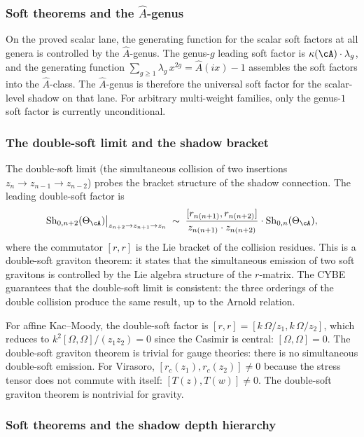 \subsubsection*{Soft theorems and the $\hat A$-genus}

On the proved scalar lane, the generating function for the
scalar soft factors at all genera is controlled by the
$\hat A$-genus. The genus-$g$ leading soft factor is
$\kappa(\cA)\cdot\lambda_g$, and the generating function
$\sum_{g\ge 1}\lambda_g\,x^{2g}=\hat A(ix)-1$
assembles the soft factors into the $\hat A$-class. The
$\hat A$-genus is therefore the universal soft factor for the
scalar-level shadow on that lane. For arbitrary multi-weight
families, only the genus-$1$ soft factor is currently
unconditional.

\subsubsection*{The double-soft limit and the shadow bracket}

The double-soft limit (the simultaneous collision of two
insertions $z_n\to z_{n-1}\to z_{n-2}$) probes the bracket
structure of the shadow connection. The leading double-soft
factor is
\[
\mathrm{Sh}_{0,n+2}(\Theta_\cA)\big|_{z_{n+2}\to z_{n+1}
\to z_n}
\;\sim\;
\frac{[r_{n(n+1)},r_{n(n+2)}]}{z_{n(n+1)}\cdot z_{n(n+2)}}
\cdot\mathrm{Sh}_{0,n}(\Theta_\cA),
\]
where the commutator $[r,r]$ is the Lie bracket of the
collision residues. This is a double-soft graviton theorem:
it states that the simultaneous emission of two soft gravitons
is controlled by the Lie algebra structure of the $r$-matrix.
The CYBE guarantees that the double-soft limit is consistent:
the three orderings of the double collision produce the same
result, up to the Arnold relation.

For affine Kac--Moody, the double-soft factor is
$[r,r]=[k\,\Omega/z_1,k\,\Omega/z_2]$, which reduces to
$k^2[\Omega,\Omega]/(z_1z_2)=0$
since the Casimir is central: $[\Omega,\Omega]=0$.
The double-soft graviton theorem is trivial for gauge theories:
there is no simultaneous double-soft emission. For Virasoro,
$[r_c(z_1),r_c(z_2)]\neq 0$ because the stress tensor does not
commute with itself: $[T(z),T(w)]\neq 0$. The double-soft
graviton theorem is nontrivial for gravity.

\subsubsection*{Soft theorems and the shadow depth hierarchy}

